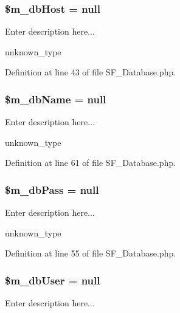 \hypertarget{classSF__Database_a78c5edb74261bdb997d4c8cc68c7db2d}{
\subsubsection[{\$m\_\-dbHost}]{\setlength{\rightskip}{0pt plus 5cm}\$m\_\-dbHost = null}}
\label{classSF__Database_a78c5edb74261bdb997d4c8cc68c7db2d}
Enter description here...

unknown\_\-type 

Definition at line 43 of file SF\_\-Database.php.

\hypertarget{classSF__Database_afa7eed8ace632016b43ba2d17ec73447}{
\subsubsection[{\$m\_\-dbName}]{\setlength{\rightskip}{0pt plus 5cm}\$m\_\-dbName = null}}
\label{classSF__Database_afa7eed8ace632016b43ba2d17ec73447}
Enter description here...

unknown\_\-type 

Definition at line 61 of file SF\_\-Database.php.

\hypertarget{classSF__Database_a871958f5b15e77a7c1f1d3eb3e603abc}{
\subsubsection[{\$m\_\-dbPass}]{\setlength{\rightskip}{0pt plus 5cm}\$m\_\-dbPass = null}}
\label{classSF__Database_a871958f5b15e77a7c1f1d3eb3e603abc}
Enter description here...

unknown\_\-type 

Definition at line 55 of file SF\_\-Database.php.

\hypertarget{classSF__Database_a2e3854a1e3a0d95f189610658ed12289}{
\subsubsection[{\$m\_\-dbUser}]{\setlength{\rightskip}{0pt plus 5cm}\$m\_\-dbUser = null}}
\label{classSF__Database_a2e3854a1e3a0d95f189610658ed12289}
Enter description here...

